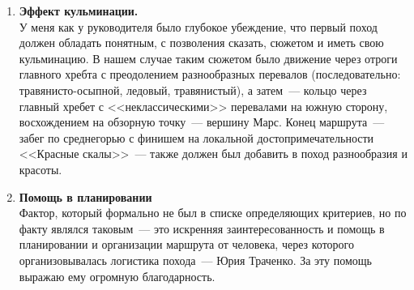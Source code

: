 \begin{enumerate}
	\item \textbf{Эффект кульминации.}\\
	У меня как у руководителя было глубокое убеждение, что первый поход должен обладать понятным, с позволения сказать, сюжетом и иметь свою кульминацию. В нашем случае таким сюжетом было движение через отроги главного хребта с преодолением разнообразных перевалов (последовательно: травянисто-осыпной, ледовый, травянистый), а затем~--- кольцо через главный хребет с <<неклассическими>> перевалами на южную сторону, восхождением на обзорную точку~--- вершину Марс. Конец маршрута~--- забег по среднегорью с финишем на локальной достопримечательности <<Красные скалы>>~--- также должен был добавить в поход разнообразия и красоты.
	
	\item\textbf{Помощь в планировании}\\
	Фактор, который формально не был в списке определяющих критериев, но по факту являлся таковым~--- это искренняя заинтересованность и помощь в планировании и организации маршрута от человека, через которого организовывалась логистика похода~--- Юрия Траченко. За эту помощь выражаю ему огромную благодарность.
	
\end{enumerate} 

